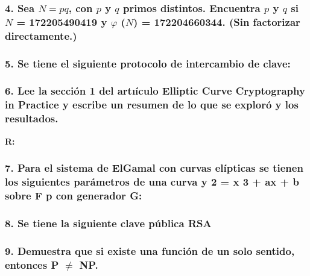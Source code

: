 \documentclass[14pt]{article}
\begin{document}
\subsubsection*{4. Sea $N = pq$, con $p$ y $q$ primos distintos. Encuentra $p$ y $q$ si $N$ = 172205490419 y $\varphi$ ($N$) = 172204660344. (Sin factorizar directamente.)}

\subsubsection*{5. Se tiene el siguiente protocolo de intercambio de clave:}

\subsubsection*{6. Lee la sección 1 del artıículo Elliptic Curve Cryptography in Practice y escribe un resumen de lo que se exploró y los resultados.}
\textbf{R:}

\subsubsection*{7. Para el sistema de ElGamal con curvas elípticas se tienen los siguientes parámetros de una curva y 2 = x 3 + ax + b sobre F p con generador G:}

\subsubsection*{8. Se tiene la siguiente clave pública RSA}

\subsubsection*{9. Demuestra que si existe una función de un solo sentido, entonces P $\neq$ NP.}
\end{document}
